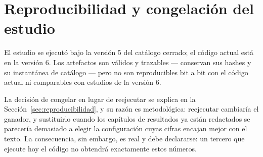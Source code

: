 \section{Reproducibilidad y congelación del estudio}

El estudio se ejecutó bajo la versión 5 del catálogo cerrado; el código actual está en la versión 6.
Los artefactos son válidos y trazables --- conservan sus hashes y su instantánea de catálogo ---
pero no son reproducibles bit a bit con el código actual ni comparables con estudios de la versión
6.

La decisión de congelar en lugar de reejecutar se explica en la
Sección~\ref{sec:reproducibilidad}, y su razón es metodológica: reejecutar cambiaría el ganador, y
sustituirlo cuando los capítulos de resultados ya están redactados se parecería demasiado a elegir
la configuración cuyas cifras encajan mejor con el texto. La consecuencia, sin embargo, es real y
debe declararse: un tercero que ejecute hoy el código no obtendrá exactamente estos números.
